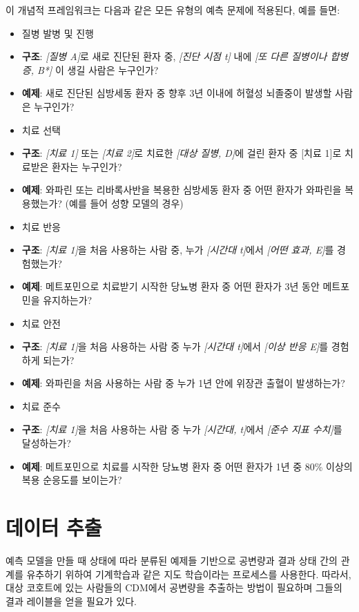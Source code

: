 \documentclass[10.5pt]{book}
\providecommand{\tightlist}{%
  \setlength{\itemsep}{0pt}\setlength{\parskip}{0pt}}
\theoremstyle{definition}
\theoremstyle{definition}
\theoremstyle{definition}
\theoremstyle{remark}
\begin{document}
이 개념적 프레임워크는 다음과 같은 모든 유형의 예측 문제에 적용된다,
예를 들면:

\begin{itemize}
\tightlist
\item
  질병 발병 및 진행
\item
  \textbf{구조}: \emph{{[}질병 A{]}}로 새로 진단된 환자 중,
  \emph{{[}진단 시점 t{]}} 내에 \emph{{[}또 다른 질병이나 합병증, B*{]}}
  이 생길 사람은 누구인가?
\item
  \textbf{예제}: 새로 진단된 심방세동 환자 중 향후 3년 이내에 허혈성
  뇌졸중이 발생할 사람은 누구인가?
\item
  치료 선택
\item
  \textbf{구조}: \emph{{[}치료 1{]}} 또는 \emph{{[}치료 2{]}}로 치료한
  \emph{{[}대상 질병, D{]}}에 걸린 환자 중 {[}치료 1{]}로 치료받은
  환자는 누구인가?
\item
  \textbf{예제}: 와파린 또는 리바록사반을 복용한 심방세동 환자 중 어떤
  환자가 와파린을 복용했는가? (예를 들어 성향 모델의 경우)
\item
  치료 반응
\item
  \textbf{구조}: \emph{{[}치료 1{]}}을 처음 사용하는 사람 중, 누가
  \emph{{[}시간대 t{]}}에서 \emph{{[}어떤 효과, E{]}}를 경험했는가?
\item
  \textbf{예제}: 메트포민으로 치료받기 시작한 당뇨병 환자 중 어떤 환자가
  3년 동안 메트포민을 유지하는가?
\item
  치료 안전
\item
  \textbf{구조}: \emph{{[}치료 1{]}}을 처음 사용하는 사람 중 누가
  \emph{{[}시간대 t{]}}에서 \emph{{[}이상 반응 E{]}}를 경험하게 되는가?
\item
  \textbf{예제}: 와파린을 처음 사용하는 사람 중 누가 1년 안에 위장관
  출혈이 발생하는가?
\item
  치료 준수
\item
  \textbf{구조}: \emph{{[}치료 1{]}}을 처음 사용하는 사람 중 누가
  \emph{{[}시간대, t{]}}에서 \emph{{[}준수 지표 수치{]}}를 달성하는가?
\item
  \textbf{예제}: 메트포민으로 치료를 시작한 당뇨병 환자 중 어떤 환자가
  1년 중 80\% 이상의 복용 순응도를 보이는가?
\end{itemize}

\section{데이터 추출}\label{--1}

예측 모델을 만들 때 상태에 따라 분류된 예제들 기반으로 공변량과 결과
상태 간의 관계를 유추하기 위하여 기계학습과 같은 지도 학습이라는
프로세스를 사용한다.  따라서, 대상 코호트에
있는 사람들의 CDM에서 공변량을 추출하는 방법이 필요하며 그들의 결과
레이블을 얻을 필요가 있다.
\end{document}
